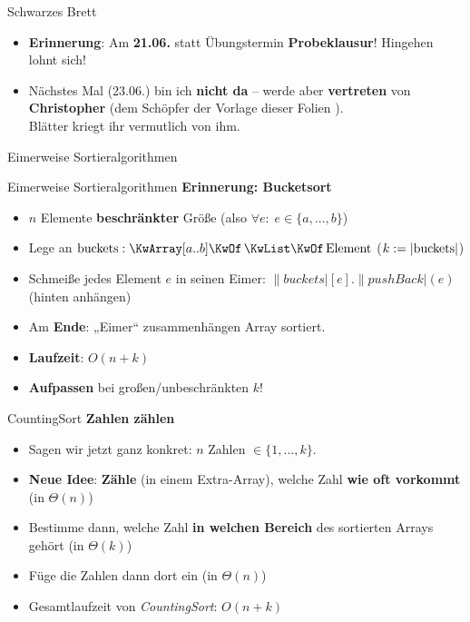 





	

\begin{frame}{Schwarzes Brett}
	\begin{itemize}
		\item \textbf{Erinnerung}: Am \textbf{21.06.} statt Übungstermin \textbf{Probeklausur}! Hingehen lohnt sich!
		\item Nächstes Mal (23.06.) bin ich \textbf{nicht da} – werde aber \textbf{vertreten} von \textbf{Christopher} (dem Schöpfer der Vorlage dieser Folien \smiley). \\
		Blätter kriegt ihr vermutlich von ihm.
	\end{itemize}
\end{frame}
	
\begin{headframe}
	Eimerweise Sortieralgorithmen
\end{headframe}
	
\begin{frame}{Eimerweise Sortieralgorithmen}
	\textbf{Erinnerung: Bucketsort} 
	\begin{itemize}
		\item $n$ Elemente \textbf{beschränkter} Größe (also $\forall e : \; e \in \{a, ..., b\} $)
		\item Lege an \: $\|buckets|: \KwArray[a..b] \KwOf \KwListOf \|Element|$ \quad ($k := \abs{\|buckets|}$)
		\item Schmeiße jedes Element $e$ in seinen Eimer: $\|buckets|[e].\|pushBack|(e)$ (hinten anhängen)
		\item Am \textbf{Ende}: „Eimer“ zusammenhängen
		\implitem Array sortiert. 
		\item \textbf{Laufzeit}: $O(n+k)$
		\item \textbf{Aufpassen} bei großen/unbeschränkten $k$!
	\end{itemize}
\end{frame}

\begin{frame}{CountingSort}
	\textbf{Zahlen zählen} 
	\begin{itemize}
		\item Sagen wir jetzt ganz konkret: $n$ Zahlen $\in \{1,...,k\}$.
		\pause
		\item \textbf{Neue Idee}: \textbf{Zähle} (in einem Extra-Array), welche Zahl \textbf{wie oft vorkommt} (in $\Theta(n)$)
		\pause
		\item Bestimme dann, welche Zahl \textbf{in welchen Bereich} des sortierten Arrays gehört (in $\Theta(k)$)
		\pause
		\item Füge die Zahlen dann dort ein (in $\Theta(n)$)
		\pause
		\item Gesamtlaufzeit von \emph{CountingSort}: $O(n + k)$
	\end{itemize}
\end{frame}

